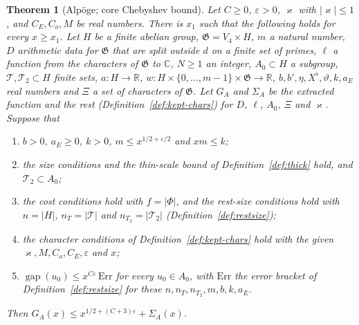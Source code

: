 \documentclass[11pt]{amsbook}
\theoremstyle{plain}
\newtheorem{theorem}{Theorem}[section]
\theoremstyle{definition}
\theoremstyle{remark}
\numberwithin{equation}{section}
\numberwithin{figure}{chapter}
\numberwithin{table}{chapter}
\newcommand{\R}{\mathbb{R}}
\renewcommand{\C}{\mathbb{C}}
\newcommand{\eps}{\varepsilon}
\newcommand{\GG}{\mathfrak{G}}
\newcommand{\Top}{\mathcal{T}}
\newcommand{\gap}{\operatorname{gap}}
\newcommand{\Err}{\mathrm{Err}}
\begin{document}
\begin{theorem}[Alp\"oge; core Chebyshev bound]\label{thm:core-bound}
Let $C\ge0$, $\eps>0$, $\varkappa$ with $|\varkappa|\le1$, and $C_E,C_o,M$ be
real
numbers. There is $x_1$ such that the following holds for every
$x\ge x_1$. Let $H$ be a finite abelian group, $\GG=V_4\times H$, $m$ a
natural number, $D$ arithmetic data for $\GG$ that are split outside
$d$ on a finite set of primes, $\ell$ a function from the characters
of $\GG$ to $\C$, $N\ge1$ an integer, $A_0\subset H$ a subgroup,
$\Top,\Top_2\subset H$ finite sets, $a\colon H\to\R$,
$w\colon H\times\{0,\dots,m-1\}\times\GG\to\R$,
$b,b',\eta,X^\flat,\vartheta,k,a_E$ real numbers and $\Xi$ a set of
characters of $\GG$. Let $G_A$ and $\Sigma_A$ be the extracted
function and the rest (Definition~\ref{def:kept-chars}) for $D$,
$\ell$, $A_0$, $\Xi$ and $\varkappa$. Suppose that
\begin{enumerate}[label=(\roman*)]
\item $b>0$, $a_E\ge0$, $k>0$, $m\le x^{1/2+\eps/2}$ and $xm\le k$;
\item the size conditions and the thin-scale bound of
Definition~\ref{def:thick} hold, and $\Top_2\subset A_0$;
\item the cost conditions hold with $f=|\Phi|$, and the rest-size
conditions hold with $n=|H|$, $n_T=|\Top|$ and $n_{T_2}=|\Top_2|$
(Definition~\ref{def:restsize});
\item the character conditions of Definition~\ref{def:kept-chars} hold
with the given $\varkappa,M,C_o,C_E,\eps$ and $x$;
\item $\gap(u_0)\le x^{C\eps}\,\Err$ for every $u_0\in A_0$, with
$\Err$ the error bracket of Definition~\ref{def:restsize} for these
$n,n_T,n_{T_2},m,b,k,a_E$.
\end{enumerate}
Then $G_A(x)\le x^{1/2+(C+3)\eps}+\Sigma_A(x)$.
\end{theorem}
\end{document}

